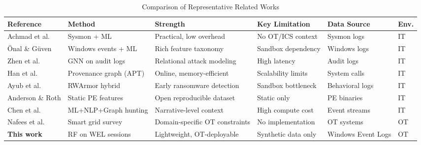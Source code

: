 \begin{table}[!t]
  \caption{Comparison of Representative Related Works}
  \label{tab:related}
  \centering
  \footnotesize
  \begin{tabular}{llllll}
    \hline
    Reference & Method & Strength & Key Limitation & Data Source & Env. \\
    \hline
    Achmad et al.\ \cite{achmad2025}        & Sysmon + ML             & Practical, low overhead         & No OT/ICS context     & Sysmon logs        & IT \\
    \"{O}nal \& G\"{u}ven \cite{onal2025}   & Windows events + ML     & Rich feature taxonomy           & Sandbox dependency    & Windows logs       & IT \\
    Zhen et al.\ \cite{zhen2025}            & GNN on audit logs       & Relational attack modeling      & High latency          & Audit logs         & IT \\
    Han et al.\ \cite{han2020}              & Provenance graph (APT)  & Online, memory-efficient        & Scalability limits    & System calls       & IT \\
    Ayub et al.\ \cite{ayub2023}            & RWArmor hybrid          & Early ransomware detection      & Sandbox bottleneck    & Behavioral logs    & IT \\
    Anderson \& Roth \cite{anderson2018}    & Static PE features      & Open reproducible dataset       & Static only           & PE binaries        & IT \\
    Chen et al.\ \cite{chen2022}            & ML+NLP+Graph hunting    & Narrative-level context         & High compute cost     & Event streams      & IT \\
    Nafees et al.\ \cite{nafees2023}        & Smart grid survey       & Domain-specific OT constraints  & No implementation     & OT systems         & OT \\
    \hline
    \textbf{This work}                      & RF on WEL sessions      & Lightweight, OT-deployable      & Synthetic data only   & Windows Event Logs & OT \\
    \hline
  \end{tabular}
\end{table}
